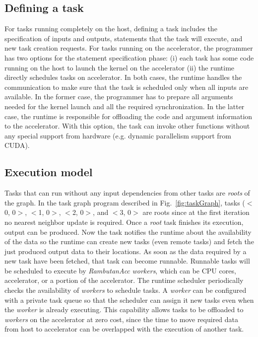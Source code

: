 \subsection{Defining a task}
For tasks running completely on the host, defining a task includes the specification of inputs and outputs, statements that the task will execute, and new task creation requests.
For tasks running on the accelerator, the programmer has two options for the statement specification phase: (i) each task has some code running on the host to launch the kernel on the accelerator (ii) the runtime directly schedules tasks on accelerator.
In both cases, the runtime handles the communication to make sure that the task is scheduled only when all inputs are available.
In the former case, the programmer has to prepare all arguments needed for the kernel launch and all the required synchronization.
In the latter case, the runtime is responsible for offloading the code and argument information to the accelerator.
With this option, the task can invoke other functions without any special support from hardware (e.g. dynamic parallelism support from CUDA).


\subsection{Execution model}
Tasks that can run without any input dependencies from other tasks are {\em roots} of the graph.
In the task graph program described in Fig.~\ref{fig:taskGraph}, tasks ($<$0, 0$>$, $<$1, 0$>$, $<$2, 0$>$, and $<$3, 0$>$ are roots since at the first iteration no nearest neighbor update is required.
Once a {\em root} task finishes its execution, output can be produced.
Now the task notifies the runtime about the availability of the data so the runtime can create new tasks (even remote tasks) and fetch the just produced output data to their locations.
As soon as the data required by a new task have been fetched, that task can become runnable.
Runnable tasks will be scheduled to execute by {\em RambutanAcc} {\em workers}, which can be CPU cores, accelerator, or a portion of the accelerator.
The runtime scheduler periodically checks the availability of {\em workers} to schedule tasks. 
A {\em worker} can be configured with a private task queue so that the scheduler can assign it new tasks even when the {\em worker} is already executing. 
This capability allows tasks to be offloaded to {\em workers} on the accelerator at zero cost, since the time to move required data from host to accelerator can be overlapped with the execution of another task.

